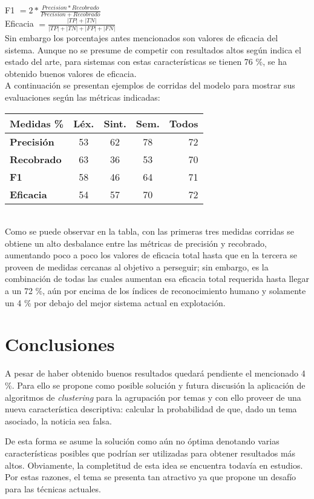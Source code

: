 \documentclass{llncs}
\begin{document}
\begin{multicols}{2}[]
F1  $= 2 * \frac{Precision * Recobrado}{Precision + Recobrado}$\\

Eficacia $ = \frac{|TP| + |TN|}{|TP| + |TN| + |FP| + |FN|}$\\

Sin embargo los porcentajes antes mencionados son valores de eficacia del sistema. Aunque no se presume de competir con resultados altos seg\'un indica el estado del arte, para
sistemas con estas caracter\'isticas se tienen 76 \%, se ha obtenido buenos valores de eficacia. \\

A continuaci\'on se presentan ejemplos de corridas del modelo para mostrar sus evaluaciones seg\'un las m\'etricas indicadas:\\

\begin{tabular}{l|c|c|c|r} %
	\hline
	\textbf{Medidas \%} & \textbf{L\'ex.} & \textbf{Sint.} & \textbf{Sem.} & \textbf{Todos}\\
	\hline
	\textbf{Precisi\'on} & 53 & 62 & 78 & 72\\
	\hline
	\textbf{Recobrado} & 63 & 36 & 53 & 70\\
	\hline
	\textbf{F1} & 58 & 46 & 64 & 71\\
	\hline
	\textbf{Eficacia} & 54 & 57 & 70 & 72\\
	\hline
\end{tabular}\\

Como se puede observar en la tabla, con las primeras tres medidas corridas se obtiene un alto desbalance entre las m\'etricas de precisi\'on y recobrado, aumentando poco a poco los
valores de eficacia total hasta que en la tercera se proveen de medidas cercanas al objetivo a perseguir; sin embargo, es la combinaci\'on de todas las cuales aumentan esa eficacia total
requerida hasta llegar a un 72 \%, a\'un por encima de los \'indices de reconocimiento humano y solamente un 4 \% por debajo del mejor sistema actual en explotaci\'on.

\section{Conclusiones}

A pesar de haber obtenido buenos resultados quedar\'a pendiente el mencionado 4 \%. Para ello se propone como posible soluci\'on y futura discusi\'on la aplicaci\'on de algoritmos de
\textit{clustering} para la agrupaci\'on por temas y con ello proveer de una nueva caracter\'istica descriptiva: calcular la probabilidad de que, dado un tema asociado, la noticia sea falsa.

De esta forma se asume la soluci\'on como a\'un no \'optima denotando varias caracter\'isticas posibles que podr\'ian ser utilizadas para obtener resultados m\'as altos. Obviamente,
la completitud de esta idea se encuentra todav\'ia en estudios. Por estas razones, el tema se presenta tan atractivo ya que propone un desaf\'io para las t\'ecnicas actuales.

\end{multicols}
\end{document}
